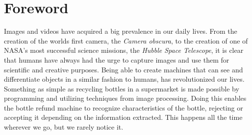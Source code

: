 \chapter{Foreword}
Images and videos have acquired a big prevalence in our daily lives. From the creation of the worlds first camera, the \textit{Camera obscura}, to the creation of one of NASA's most successful science missions, the \textit{Hubble Space Telescope}, it is clear that humans have always had the urge to capture images and use them for scientific and creative purposes. Being able to create machines that can see and differentiate objects in a similar fashion to humans, has revolutionized our lives. Something as simple as recycling bottles in a supermarket is made possible by programming and utilizing techniques from image processing. Doing this enables the bottle refund machine to recognize characteristics of the bottle, rejecting or accepting it depending on the information extracted. This happens all the time wherever we go, but we rarely notice it.